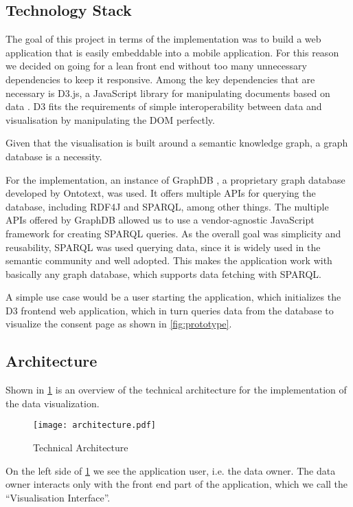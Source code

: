 \documentclass[../paper.tex]{subfiles}
\begin{document}
  \subsection{Technology Stack}

  The goal of this project in terms of the implementation was to
  build a web application that is easily embeddable into a mobile application.
  For this reason we decided on going for a lean front end without too many
  unnecessary dependencies to keep it responsive. Among the key dependencies that
  are necessary is D3.js, a JavaScript library for manipulating documents based
  on data \cite{d3}. D3 fits the requirements of simple interoperability between
  data and visualisation by manipulating the DOM perfectly.

  Given that the
  visualisation is built around a semantic knowledge graph, a graph database is
  a necessity.

  For the implementation, an instance of  GraphDB \cite{graphdb}, a proprietary graph
  database developed by Ontotext, was used. It offers multiple APIs for querying the database, 
  including RDF4J and SPARQL, among other things. The multiple APIs offered by
  GraphDB allowed us to use a vendor-agnostic JavaScript framework for
  creating SPARQL queries. As the overall goal was simplicity and reusability,
  SPARQL was used querying data, since it is widely used
  in the semantic community and well adopted. This makes the application work with
  basically any graph database, which supports data fetching with SPARQL.

  A simple use case would be a user starting the application, which initializes
  the D3 frontend web application, which in turn queries data from the database
  to visualize the consent page as shown in \cref{fig:prototype}.

  \subsection{Architecture}

  Shown in \cref{fig:architecture} is an overview of the technical architecture
  for the implementation of the data visualization.

  \begin{figure}
    \centering
    \texttt{[image: architecture.pdf]}
    \caption{Technical Architecture}
    \label{fig:architecture}
  \end{figure}

  On the left side of \cref{fig:architecture} we see the application user, i.e.
  the data owner. The data owner interacts only with the front end part of the
  application, which we call the “Visualisation Interface”.
\end{document}
